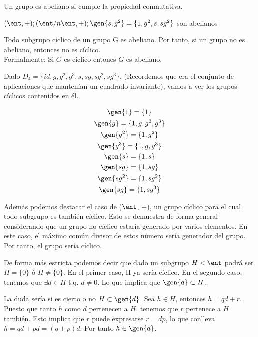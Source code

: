 \documentclass{apuntes}
\begin{document}
  \begin{defn}
   Un grupo es abeliano si cumple la propiedad conmutativa.
  \end{defn}

  \begin{example}  $(\ent, +); (\ent/n\ent, +); \gen{s,g^{2}} =\{1,g^{2},s,sg^{2}\}$ son abelianos
  \end{example}
  
  \begin{lemma}
   Todo subgrupo cíclico de un grupo G es abeliano. Por tanto, si un grupo no es abeliano, entonces no es cíclico.\\
   Formalmente: Si $G$ es cíclico entones $G$ es abeliano.
  \end{lemma}

  \begin{example}
   Dado $D_{4}=\{id, g, g^{2}, g^{3}, s, sg, sg^{2},sg^{3}\}$, (Recordemos que era el conjunto de aplicaciones que mantenían un cuadrado invariante), vamos a ver los grupos cíclicos contenidos en él.
   
  \begin{gather*}
  \gen{1}=\{1\} \\
  \gen{g} =\{1,g,g^{2}, g^{3}\}\\
  \gen{g^{2}}=\{1,g^{2}\}\\
  \gen{g^{3}}=\{1,g, g^{3}\}\\
  \gen{s} =\{1,s\}\\
  \gen{sg}=\{1, sg\}\\
  \gen{sg^{2}} =\{1, sg^{2}\}\\
  \gen{sg}=\{1, sg^{3}\}
  \end{gather*}
   
   Además podemos destacar el caso de ($\ent$, +), un grupo cíclico para el cual todo subgrupo es también cíclico. Esto se demuestra
   de forma general considerando que un grupo no cíclico estaría generado por varios elementos. En este caso, el máximo común
   divisor de estos número sería generador del grupo. Por tanto, el grupo sería cíclico.
 
   De forma más estricta podemos decir que dado un subgrupo $H<\ent$ podrá ser $H=\{0\}$ ó $H\neq\{0\}$. 
   En el primer caso, H ya sería cíclico. En el segundo caso, tenemos que $\exists  d \in  H$ t.q. $d\neq 0$. Lo que implica
   que $\gen{d} \subset H$. 
   
   La duda sería si es cierto o no $H\subset \gen{d}$. Sea $h \in H$, entonces $h=qd+r$. Puesto que tanto $h$ como $d$ pertenecen a $H$,
   tenemos que $r$ pertenece a $H$ también. Esto implica que $r$ puede expresarse $r=dp$, lo que conlleva $h=qd+pd=(q+p)d$. Por tanto $h \in \gen{d}$.
  \end{example}
\end{document}
